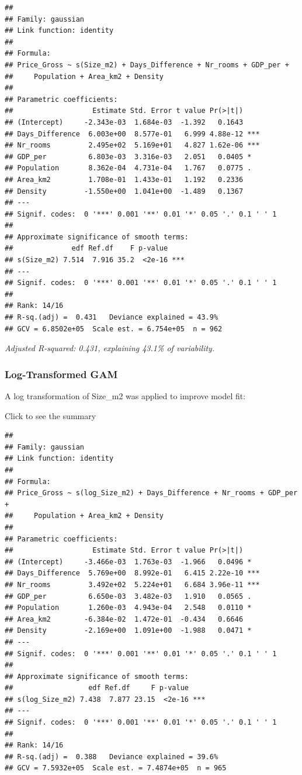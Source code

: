 \documentclass[
]{article}
\begin{document}
\begin{verbatim}
## 
## Family: gaussian 
## Link function: identity 
## 
## Formula:
## Price_Gross ~ s(Size_m2) + Days_Difference + Nr_rooms + GDP_per + 
##     Population + Area_km2 + Density
## 
## Parametric coefficients:
##                   Estimate Std. Error t value Pr(>|t|)    
## (Intercept)     -2.343e-03  1.684e-03  -1.392   0.1643    
## Days_Difference  6.003e+00  8.577e-01   6.999 4.88e-12 ***
## Nr_rooms         2.495e+02  5.169e+01   4.827 1.62e-06 ***
## GDP_per          6.803e-03  3.316e-03   2.051   0.0405 *  
## Population       8.362e-04  4.731e-04   1.767   0.0775 .  
## Area_km2         1.708e-01  1.433e-01   1.192   0.2336    
## Density         -1.550e+00  1.041e+00  -1.489   0.1367    
## ---
## Signif. codes:  0 '***' 0.001 '**' 0.01 '*' 0.05 '.' 0.1 ' ' 1
## 
## Approximate significance of smooth terms:
##              edf Ref.df    F p-value    
## s(Size_m2) 7.514  7.916 35.2  <2e-16 ***
## ---
## Signif. codes:  0 '***' 0.001 '**' 0.01 '*' 0.05 '.' 0.1 ' ' 1
## 
## Rank: 14/16
## R-sq.(adj) =  0.431   Deviance explained = 43.9%
## GCV = 6.8502e+05  Scale est. = 6.754e+05  n = 962
\end{verbatim}

\emph{Adjusted R-squared: 0.431, explaining 43.1\% of variability.}

\subsubsection{Log-Transformed GAM}\label{log-transformed-gam}

A log transformation of Size\_m2 was applied to improve model fit:

Click to see the summary

\begin{verbatim}
## 
## Family: gaussian 
## Link function: identity 
## 
## Formula:
## Price_Gross ~ s(log_Size_m2) + Days_Difference + Nr_rooms + GDP_per + 
##     Population + Area_km2 + Density
## 
## Parametric coefficients:
##                   Estimate Std. Error t value Pr(>|t|)    
## (Intercept)     -3.466e-03  1.763e-03  -1.966   0.0496 *  
## Days_Difference  5.769e+00  8.992e-01   6.415 2.22e-10 ***
## Nr_rooms         3.492e+02  5.224e+01   6.684 3.96e-11 ***
## GDP_per          6.650e-03  3.482e-03   1.910   0.0565 .  
## Population       1.260e-03  4.943e-04   2.548   0.0110 *  
## Area_km2        -6.384e-02  1.472e-01  -0.434   0.6646    
## Density         -2.169e+00  1.091e+00  -1.988   0.0471 *  
## ---
## Signif. codes:  0 '***' 0.001 '**' 0.01 '*' 0.05 '.' 0.1 ' ' 1
## 
## Approximate significance of smooth terms:
##                  edf Ref.df     F p-value    
## s(log_Size_m2) 7.438  7.877 23.15  <2e-16 ***
## ---
## Signif. codes:  0 '***' 0.001 '**' 0.01 '*' 0.05 '.' 0.1 ' ' 1
## 
## Rank: 14/16
## R-sq.(adj) =  0.388   Deviance explained = 39.6%
## GCV = 7.5932e+05  Scale est. = 7.4874e+05  n = 965
\end{verbatim}
\end{document}
